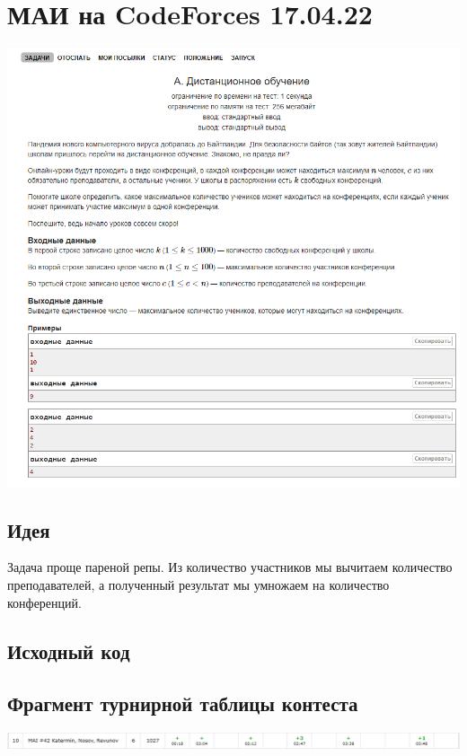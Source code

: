 \section*{МАИ на CodeForces 17.04.22}
\includegraphics[scale=0.7]{statements/1704_A.png}\newline\noindent
\subsection*{Идея}
Задача проще пареной репы. Из количество участников мы вычитаем количество преподавателей, а полученный результат мы умножаем на количество конференций.
\subsection*{Исходный код}

\subsection*{Фрагмент турнирной таблицы контеста}
\includegraphics[scale=0.5]{standings/1704.png}\newline\noindent
\pagebreak


